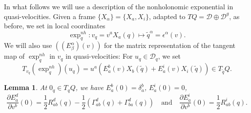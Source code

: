 \documentclass[11pt]{article}
\newtheorem{lem}{Lemma}
\def\D{{\mathcal D}}
\begin{document}
In what follows we will use a description of the nonholonomic exponential in quasi-velocities. Given a frame $\{X_\alpha\} = \{X_a,X_i\}$, adapted to $TQ=\D \oplus \D^g$, as before, we set  in local coordinates
$$
\exp^{nh}_q:  v_q=v^a X_a(q)\mapsto \tilde{q}^\alpha =\epsilon^\alpha(v).
$$
We will also  use $((E^\alpha_\beta)(v))$ for the matrix representation of the tangent map of $\exp^{nh}_q$ in $v_q$ in quasi-velocities: For $u_q\in \D_q$, we set 
\[
    T_{v_q}(\exp^{nh}_q)(u_q)  = u^a \left(E^b_a(v)X_b(\tilde{q})+E^i_a(v) X_i(\tilde{q})\right) \in T_{\tilde q}Q.
\]
		
		
\begin{lem} \label{hulplemma} At $0_q\in T_qQ$, we have 
$E_a^b(0)=\delta_a^b$, $E_a^i(0)=0$,
$$
\frac{\partial E^d_a}{\partial v^b}(0)=\frac{1}{2}R^d_{ab}(q)-\frac{1}{2}(\Gamma_{ab}^d(q)+\Gamma^d_{ba}(q)) \quad\text{and}\quad \frac{\partial E^i_a}{\partial v^b}(0)=\frac{1}{2}R^i_{ab}(q).
$$
\end{lem}
\end{document}
